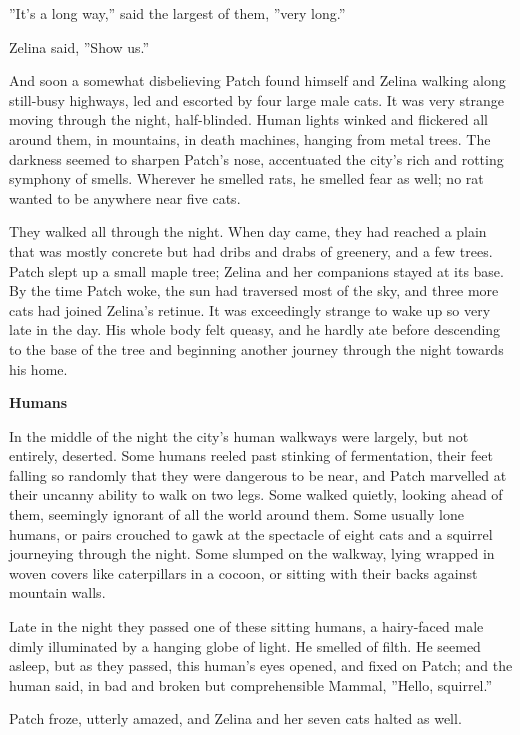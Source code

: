 \documentclass[11pt]{article}
\begin{document}
 ''It's a long way,'' said the largest of them, ''very long.''\par
 Zelina said, ''Show us.''\par
 And soon a somewhat disbelieving Patch found himself and Zelina walking along still-busy highways, led and escorted by four large male cats. It was very strange moving through the night, half-blinded. Human lights winked and flickered all around them, in mountains, in death machines, hanging from metal trees. The darkness seemed to sharpen Patch's nose, accentuated the city's rich and rotting symphony of smells. Wherever he smelled rats, he smelled fear as well; no rat wanted to be anywhere near five cats.\par
 They walked all through the night. When day came, they had reached a plain that was mostly concrete but had dribs and drabs of greenery, and a few trees. Patch slept up a small maple tree; Zelina and her companions stayed at its base. By the time Patch woke, the sun had traversed most of the sky, and three more cats had joined Zelina's retinue. It was exceedingly strange to wake up so very late in the day. His whole body felt queasy, and he hardly ate before descending to the base of the tree and beginning another journey through the night towards his home.\par
\par
{\bf Humans\par
}\par
 In the middle of the night the city's human walkways were largely, but not entirely, deserted. Some humans reeled past stinking of fermentation, their feet falling so randomly that they were dangerous to be near, and Patch marvelled at their uncanny ability to walk on two legs. Some walked quietly, looking ahead of them, seemingly ignorant of all the world around them. Some %
 usually lone humans, or pairs %
 crouched to gawk at the spectacle of eight cats and a squirrel journeying through the night. Some slumped on the walkway, lying wrapped in woven covers like caterpillars in a cocoon, or sitting with their backs against mountain walls.\par
Late in the night they passed one of these sitting humans, a hairy-faced male dimly illuminated by a hanging globe of light. He smelled of filth. He seemed asleep, but as they passed, this human's eyes opened, and fixed on Patch; and the human said, in bad and broken but comprehensible Mammal, ''Hello, squirrel.''\par
Patch froze, utterly amazed, and Zelina and her seven cats halted as well.\par
\end{document}
